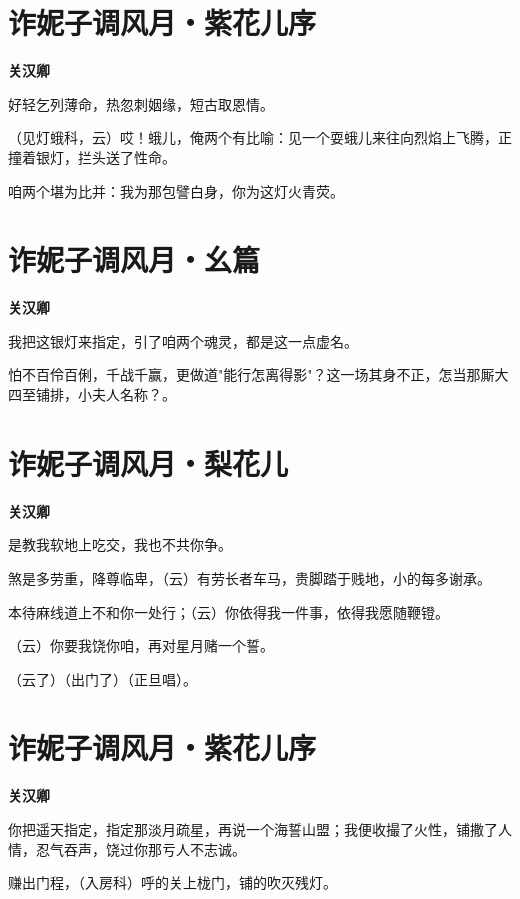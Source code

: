 \documentclass[12pt,a4paper]{ctexbook}
\begin{document}
\section{诈妮子调风月・紫花儿序}
\textbf{关汉卿}\par\vspace{0.5em}
好轻乞列薄命，热忽刺姻缘，短古取恩情。\par
（见灯蛾科，云）哎！蛾儿，俺两个有比喻：见一个耍蛾儿来往向烈焰上飞腾，正撞着银灯，拦头送了性命。\par
咱两个堪为比并：我为那包譬白身，你为这灯火青荧。\par

\section{诈妮子调风月・幺篇}
\textbf{关汉卿}\par\vspace{0.5em}
我把这银灯来指定，引了咱两个魂灵，都是这一点虚名。\par
怕不百伶百俐，千战千赢，更做道"能行怎离得影"？这一场其身不正，怎当那厮大四至铺排，小夫人名称？。\par

\section{诈妮子调风月・梨花儿}
\textbf{关汉卿}\par\vspace{0.5em}
是教我软地上吃交，我也不共你争。\par
煞是多劳重，降尊临卑，（云）有劳长者车马，贵脚踏于贱地，小的每多谢承。\par
本待麻线道上不和你一处行；（云）你依得我一件事，依得我愿随鞭镫。\par
（云）你要我饶你咱，再对星月赌一个誓。\par
（云了）（出门了）（正旦唱）。\par

\section{诈妮子调风月・紫花儿序}
\textbf{关汉卿}\par\vspace{0.5em}
你把遥天指定，指定那淡月疏星，再说一个海誓山盟；我便收撮了火性，铺撒了人情，忍气吞声，饶过你那亏人不志诚。\par
赚出门程，（入房科）呼的关上栊门，铺的吹灭残灯。\par
\end{document}

